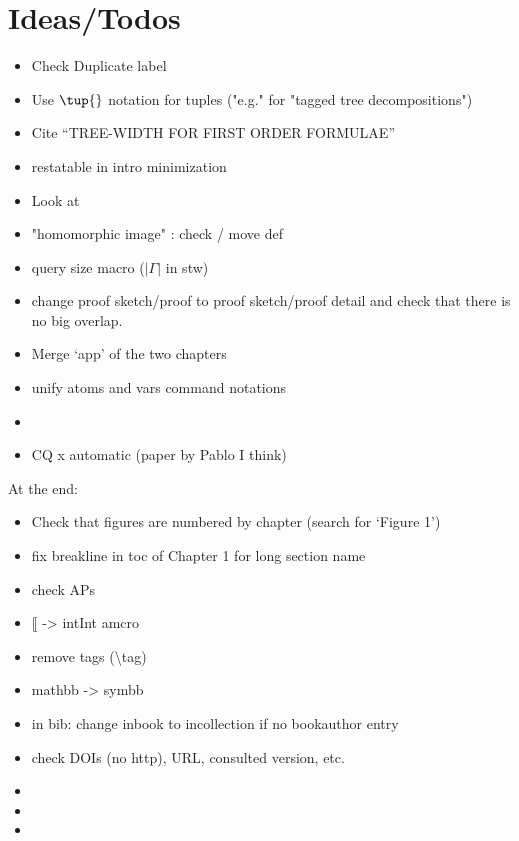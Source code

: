 \chapter*{Ideas/Todos}

\begin{itemize}
	\item Check Duplicate label
	\item Use $\tup{}$ notation for tuples ("e.g." for "tagged tree decompositions")
	\item Cite ``TREE-WIDTH FOR FIRST ORDER FORMULAE''
	\item restatable in intro minimization
	\item Look at \cite{ChenGottlobLanzingerPichler2020Semantic}
	\item "homomorphic image" : check / move def
	\item query size macro ($|\Gamma|$ in stw)
	\item change proof sketch/proof to proof sketch/proof detail and check
		that there is no big overlap.
	\item Merge `app' of the two chapters
	\item unify atoms and vars command notations
	\item {}
	\item CQ x automatic (paper by Pablo I think)
\end{itemize}

At the end:
\begin{itemize}
	\item Check that figures are numbered by chapter (search for `Figure 1')
	\item fix breakline in toc of Chapter 1 for long section name
	\item check APs 
	\item $\lBrack$ -> intInt amcro
	\item remove tags (\textsf{\backslash tag})
	\item mathbb -> symbb
	\item in bib: change inbook to incollection if no bookauthor entry
	\item check DOIs (no http), URL, consulted version, etc.
	\item {}
	\item {}
	\item {}
\end{itemize}

